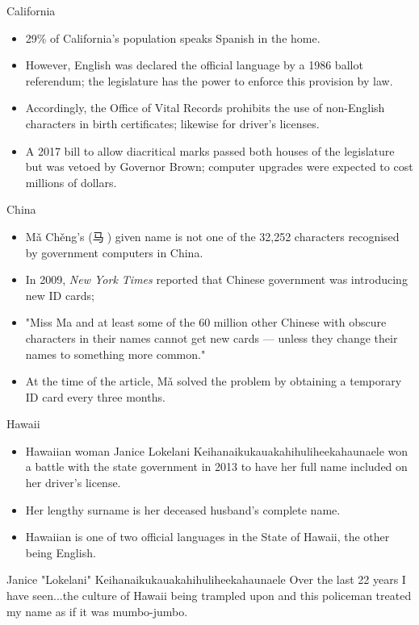 \documentclass{beamer}
\begin{document}
\begin{frame}{California}
\begin{itemize}
\item 29\% of California's population speaks Spanish in the home.
\parencite{acs-lang-states}
\item However, English was declared the official language by a 1986 ballot
referendum; the legislature has the power to enforce this provision by law.
\item Accordingly, the Office of Vital Records prohibits the use of non-English
characters in birth certificates; likewise for driver's licenses.
\parencite{larson11}
\item A 2017 bill to allow diacritical marks passed both houses of the
legislature but was vetoed by Governor Brown; computer upgrades were expected to
cost millions of dollars.
\end{itemize}
\end{frame}

\begin{frame}{China}
\begin{itemize}
\item Mǎ Chěng's ({\zafont 马}{\zbfont 𩧢}) given name is not one of the 32,252 characters recognised
by government computers in China.
\item In 2009, \textit{New York Times} reported that Chinese government was
introducing new ID cards;
\item "Miss Ma and at least some of the 60 million other Chinese with obscure
characters in their names cannot get new cards — unless they change their names
to something more common." \parencite{lafraniere09}
\item At the time of the article, Mǎ solved the problem by obtaining a
temporary ID card every three months.
\end{itemize}
\end{frame}

\begin{frame}{Hawaii}
\begin{itemize}
\item Hawaiian woman Janice Lokelani Keihanaikukauakahihuliheekahaunaele won a
battle with the state government in 2013 to have her full name included on her
driver's license.
\item Her lengthy surname is her deceased husband's complete name.
\item Hawaiian is one of two official languages in the State of Hawaii, the
other being English.
\end{itemize}
\begin{aquote}{Janice "Lokelani" Keihanaikukauakahihuliheekahaunaele}
Over the last 22 years I have seen...the culture of Hawaii being trampled upon
and this policeman treated my name as if it was mumbo-jumbo.
\end{aquote}
\end{frame}
\end{document}
